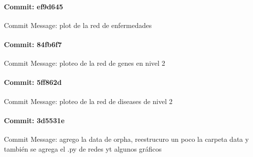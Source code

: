 \documentclass{article}
\begin{document}
\paragraph{Commit: ef9d645}
Commit Message: plot de la red de enfermedades

\paragraph{Commit: 84fb6f7}
Commit Message: ploteo de la red de genes en nivel 2

\paragraph{Commit: 5ff862d}
Commit Message: ploteo de la red de diseases de nivel 2

\paragraph{Commit: 3d5531e}
Commit Message: agrego la data de orpha, reestrucuro un poco la carpeta data y también se agrega el .py de redes yt algunos gráficos

\end{document}
